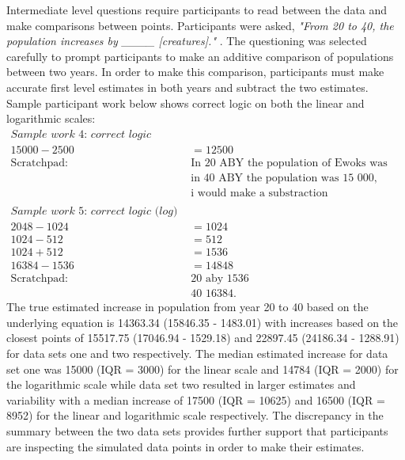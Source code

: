 \documentclass[print]{nuthesis}
\begin{document}
Intermediate level questions require participants to read between the data and make comparisons between points.
Participants were asked, \textit{"From 20 to 40, the population increases by \_\_\_\_ [creatures]."} .
The questioning was selected carefully to prompt participants to make an additive comparison of populations between two years.
In order to make this comparison, participants must make accurate first level estimates in both years and subtract the two estimates.
Sample participant work below shows correct logic on both the linear and logarithmic scales:
\begin{align}
\textit{Sample work 4: correct logic (linear)} \nonumber\\
15000 - 2500 & = 12500\nonumber\\
\text{Scratchpad: } &\text{In 20 ABY the population of Ewoks was 2500,}\nonumber\\
                   &\text{in 40 ABY the population was 15 000,}\nonumber\\
                   &\text{i would make a substraction}\nonumber \\
\nonumber \\
\textit{Sample work 5: correct logic (log)} \nonumber\\
2048 - 1024  & = 1024 \nonumber\\
1024 - 512   & = 512 \nonumber\\
1024 + 512   & = 1536 \nonumber\\
16384 - 1536 & = 14848 \nonumber\\
\text{Scratchpad: }  & \text{20 aby 1536} \nonumber\\
             & \text{40 16384.} \nonumber
\end{align}
The true estimated increase in population from year 20 to 40 based on the underlying equation is 14363.34 (15846.35 - 1483.01) with increases based on the closest points of 15517.75 (17046.94 - 1529.18) and 22897.45 (24186.34 - 1288.91) for data sets one and two respectively.
The median estimated increase for data set one was 15000 (IQR = 3000) for the linear scale and 14784 (IQR = 2000) for the logarithmic scale while data set two resulted in larger estimates and variability with a median increase of 17500 (IQR = 10625) and 16500 (IQR = 8952) for the linear and logarithmic scale respectively.
The discrepancy in the summary between the two data sets provides further support that participants are inspecting the simulated data points in order to make their estimates.
\end{document}
